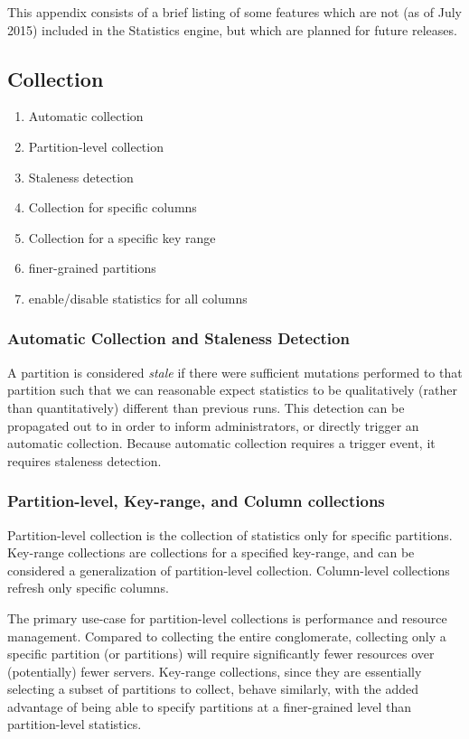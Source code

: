 This appendix consists of a brief listing of some features which are not (as of July 2015) included in the Statistics engine, but which are planned for future releases.

\subsection{Collection}

\begin{enumerate} 
\item Automatic collection
\item Partition-level collection
\item Staleness detection
\item Collection for specific columns
\item Collection for a specific key range
\item finer-grained partitions
\item enable/disable statistics for all columns
\end{enumerate}

\subsubsection{Automatic Collection and Staleness Detection}
A partition is considered \emph{stale} if there were sufficient mutations performed to that partition such that we can reasonable expect statistics to be qualitatively (rather than quantitatively) different than previous runs. This detection can be propagated out to \systablestats in order to inform administrators, or directly trigger an automatic collection. Because automatic collection requires a trigger event, it requires staleness detection.

\subsubsection{Partition-level, Key-range, and Column collections}
Partition-level collection is the collection of statistics only for specific partitions. Key-range collections are collections for a specified key-range, and can be considered a generalization of partition-level collection. Column-level collections refresh only specific columns.

The primary use-case for partition-level collections is performance and resource management. Compared to collecting the entire conglomerate, collecting only a specific partition (or partitions) will require significantly fewer resources over (potentially) fewer servers. Key-range collections, since they are essentially selecting a subset of partitions to collect, behave similarly, with the added advantage of being able to specify partitions at a finer-grained level than partition-level statistics.

